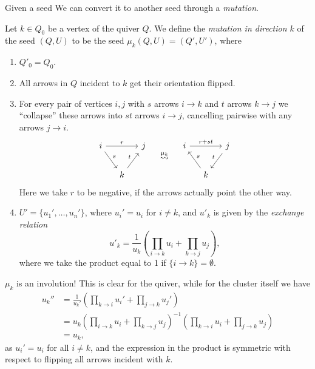 \documentclass{article}
\begin{document}
Given a seed We can convert it to another seed through a \emph{mutation}.
\begin{definition}
	Let $k \in Q_0$ be a vertex of the quiver $Q$.
	We define the \emph{mutation in direction $k$} of the seed
	$(Q, U)$ to be the seed $\mu_k(Q, U) = (Q', U')$, where
	\begin{enumerate}
		\item $Q'_0 = Q_0$.
		\item All arrows in $Q$ incident to $k$ get their orientation flipped.
		\item For every pair of vertices $i,j$ with $s$ arrows $i \to k$ and $t$ arrows $k \to j$ we
		      ``collapse'' these arrows into $st$ arrows $i \to j$, cancelling pairwise with any
		      arrows $j \to i$.
		      \begin{equation*}
			      \begin{tikzcd}[column sep=small]
				      i \ar[rr, "r"] \ar[rd, "s"] && j \\
				      & k \ar[ur, "t"]
			      \end{tikzcd}
			      \quad\overset{\mu_k}{\leadsto }\quad
			      \begin{tikzcd}[column sep=small]
				      i \ar[rr, "r + st"] \ar[rd,leftarrow, "s"] && j \\
				      & k \ar[ur, leftarrow, "t"]
			      \end{tikzcd}
		      \end{equation*}
		      Here we take $r$ to be negative, if the arrows actually point the other way.
		\item $U' = \{u_1', \dots, u_n'\}$, where $u_i' = u_i$ for $i \neq k$, and $u'_k$
		      is given by the \emph{exchange relation}
		      \begin{equation*}
			      u'_k = \frac{1}{u_k} \left(\prod_{i \to k} u_i + \prod_{k \to j} u_j\right),
		      \end{equation*}
		      where we take the product equal to 1 if $\{i \to k\} = \emptyset$.
	\end{enumerate}
\end{definition}
\begin{remark}
	$\mu_k$ is an involution! This is clear for the quiver, while for the cluster itself we have
	\begin{align*}
		u_k''
		 & = \frac{1}{u_k'}\left(\prod_{k \to i}u_i' + \prod_{j \to k} u_j'\right)                                                \\
		 & = u_k \left(\prod_{i \to k} u_i + \prod_{k \to j}u_j\right)^{-1} \left(\prod_{k \to i}u_i + \prod_{j \to k} u_j\right) \\
		 & = u_k,
	\end{align*}
	as $u_i' = u_i$ for all $i \neq k$, and the expression in the product
	is symmetric with respect to flipping all arrows incident with $k$.
\end{remark}
\end{document}
